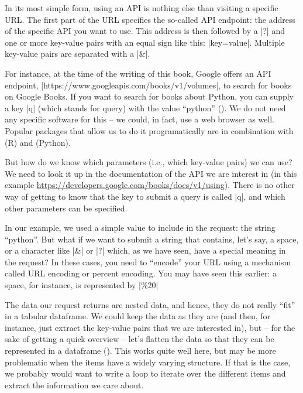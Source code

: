 In its most simple form, using an API is nothing else than visiting
a specific URL. The first part of the URL specifies the so-called
API endpoint: the address of the specific API you want to use. This
address is then followed by a |?| and one or more key-value pairs with an
equal sign like this: |key=value|. Multiple key-value pairs are
separated with a |\&|.

For instance, at the time of the writing of this book, Google offers
an API endpoint, |https://www.googleapis.com/books/v1/volumes|, to search for books on Google Books.
If you want to search for books about Python, you can supply a key |q| (which stands for query) with
the value ``python'' (). We do not need any specific
software for this -- we could, in fact, use a web browser as well.
Popular packages that allow us to do it programatically are 
in combination with  (R) and  (Python).

But how do we know which parameters (i.e., which key-value pairs) we can use?
We need to look it up in the documentation of the API we are
interest in (in this example \url{https://developers.google.com/books/docs/v1/using}).
There is no other way of getting to know that the key to submit a query
is called |q|, and which other parameters can be specified.

\begin{feature}
  In our example, we used a simple value to include in the request:
  the string ``python''.  But what if we want to submit a string that
  contains, let's say, a space, or a character like |&| or |?| which,
  as we have seen, have a special meaning in the request? In these
  cases, you need to ``encode'' your URL using a mechanism called URL
  encoding or percent encoding. You may have seen this earlier: a
  space, for instance, is represented by |\%20|
\end{feature}





The data our request returns are nested data, and hence, they do not
really ``fit'' in a tabular dataframe. We could keep the data as they
are (and then, for instance, just extract the key-value pairs that we
are interested in), but -- for the sake of getting a quick overview --
let's flatten the data so that they can be represented in a dataframe
(). This works quite well here, but may be more
problematic when the items have a widely varying structure. If that
is the case, we probably would want to write a loop to iterate
over the different items and extract the information we care about.

